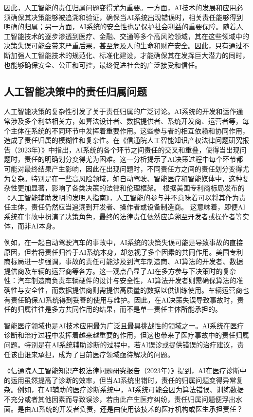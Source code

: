 因此，人工智能的责任归属问题变得尤为重要。一方面，AI技术的发展和应用必须确保其决策能够被追溯和验证，确保当AI系统出现错误时，相关责任能够得到明确的归属；另一方面，AI系统的安全性也是保护社会利益的重要保障。随着人工智能技术的逐步渗透到医疗、金融、交通等多个高风险领域，其在这些领域中的决策失误可能会带来严重后果，甚至危及人的生命和财产安全。因此，只有通过不断加强人工智能技术的规范化、标准化建设，才能确保其在发挥巨大潜力的同时，也能够确保安全、公正和可控，最终促进社会的广泛接受和信任。

\subsection{人工智能决策中的责任归属问题}
人工智能决策的复杂性引发了关于责任归属的广泛讨论。AI系统的开发和运作通常涉及多个利益相关方，如算法设计者、数据提供者、系统开发商、运营者等，每个主体在系统的不同环节中发挥着重要作用。这些参与者的相互依赖和协同作用，造成了责任归属的模糊性和复杂性。在《信通院人工智能知识产权法律问题研究报告（2023年）》中指出，AI系统的各个环节之间责任的交叉和重叠，使得当出现问题时，责任的明确划分变得尤为困难。这一分析揭示了AI决策过程中每个环节都可能对最终结果产生影响，因此在出现问题时，不同责任方之间的责任划分变得尤为复杂。特别是在一些高风险领域，如自动驾驶、智能医疗和智能媒体中，这种复杂性更加显著，影响了各类决策的法律和伦理框架。
根据美国专利商标局发布的《人工智能辅助发明的发明人指南》，人工智能的参与并不意味着可以将其作为责任主体，责任仍然应当追溯到开发者、操作者或设备制造商。 这意味着，即便AI系统在事故中扮演了决策角色，最终的法律责任依然应追溯至开发者或操作者等实体，而非AI本身。

例如，在一起自动驾驶汽车的事故中，AI系统的决策失误可能是导致事故的直接原因，但若将责任归咎于AI系统本身，却忽视了多个因素的共同作用。美国专利商标局进一步强调，事故的责任可能涉及到汽车制造商、AI算法的开发者、数据提供商及车辆的运营商等各方。这一观点凸显了AI在多方参与下决策时的复杂性：汽车制造商负责车辆硬件的设计与安全性，AI算法开发者则需确保算法的准确性与安全性，而数据提供商则需提供高质量的数据以供训练使用。车辆运营商也有责任确保AI系统得到妥善的使用与维护。因此，在AI决策失误导致事故时，责任的归属往往是多方共同作用的结果，而不是单一责任主体所能承担的。

智能医疗领域也是AI技术应用最为广泛且最具挑战性的领域之一。AI系统在医疗诊断和治疗过程中发挥着越来越重要的作用，但这也带来了医疗事故中的责任归属问题。特别是在AI系统辅助诊断的过程中，若AI误诊或提供错误的治疗建议，责任该由谁来承担，成为了目前医疗领域亟待解决的问题。

《信通院人工智能知识产权法律问题研究报告（2023年）》提到，AI在医疗诊断中的运用虽然提高了诊断的效率，但当AI系统出错时，责任的归属问题变得异常复杂。例如，在AI辅助的医疗诊断系统中，AI系统可能会因为算法错误、训练数据不充分或者其他因素而导致误诊，若由此产生医疗纠纷，责任归属问题便浮出水面。是由AI系统的开发者负责，还是由使用该技术的医疗机构或医生承担责任？

